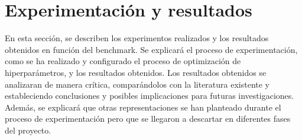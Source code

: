 \section{Experimentación y resultados}
En esta sección, se describen los experimentos realizados y los resultados
obtenidos en función del benchmark. Se explicará el proceso de experimentación,
como se ha realizado y configurado el proceso de optimización de hiperparámetros, y 
los resultados obtenidos. Los resultados obtenidos se analizaran de manera crítica, 
comparándolos con la literatura existente y estableciendo conclusiones y 
posibles implicaciones para futuras investigaciones. Además, se explicará
que otras representaciones se han planteado durante el proceso de experimentación
pero que se llegaron a descartar en diferentes fases del proyecto.





\pagebreak
